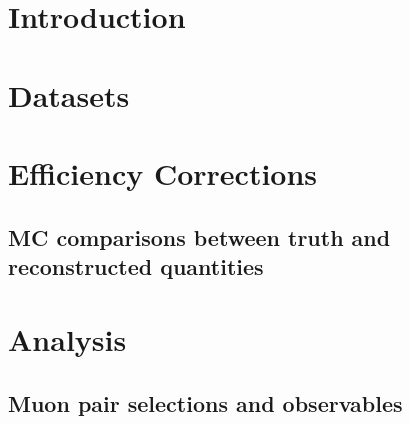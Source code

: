 \documentclass[NOTE,UKenglish,coverpage,txfonts,texlive=2019]{\ATLASLATEXPATH atlasdoc}
\begin{document}
\maketitle

\tableofcontents


\clearpage

\section{Introduction}
\label{sec:intro}

\clearpage
\section{Datasets}
\label{sec:datasets}

\clearpage
\section{Efficiency Corrections}
\label{sec:correction}

\FloatBarrier
\clearpage
\subsection{MC comparisons between truth and reconstructed quantities}
\label{sec:MC_closure}

\clearpage
\section{Analysis}
\label{sec:analysis}


\subsection{Muon pair selections and observables}
\label{sec:muon_selection}

\clearpage

\iftoggle{IncludeYields}
{
  \subsection{Extraction of the yields and widths}
}
{
  \subsection{Extraction of the widths}
}
\label{sec:DphiFits}

\clearpage
\FloatBarrier
\end{document}
